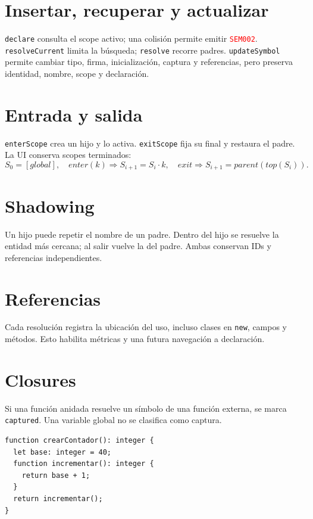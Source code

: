 \documentclass[11pt,letterpaper,oneside]{report}
\newcommand{\codigo}[1]{\texttt{#1}}
\newcommand{\diag}[1]{\textcolor{red}{\texttt{#1}}}
\begin{document}
\section{Insertar, recuperar y actualizar}

\codigo{declare} consulta el scope activo; una colisión permite emitir
\diag{SEM002}. \codigo{resolveCurrent} limita la búsqueda; \codigo{resolve} recorre
padres. \codigo{updateSymbol} permite cambiar tipo, firma, inicialización, captura y
referencias, pero preserva identidad, nombre, scope y declaración.

\section{Entrada y salida}

\codigo{enterScope} crea un hijo y lo activa. \codigo{exitScope} fija su final y
restaura el padre. La UI conserva scopes terminados:
\[
S_0=[global],\quad enter(k)\Rightarrow S_{i+1}=S_i\cdot k,\quad
exit\Rightarrow S_{i+1}=parent(top(S_i)).
\]

\section{Shadowing}

Un hijo puede repetir el nombre de un padre. Dentro del hijo se resuelve la entidad
más cercana; al salir vuelve la del padre. Ambas conservan IDs y referencias
independientes.

\section{Referencias}

Cada resolución registra la ubicación del uso, incluso clases en \codigo{new}, campos
y métodos. Esto habilita métricas y una futura navegación a declaración.

\section{Closures}

Si una función anidada resuelve un símbolo de una función externa, se marca
\codigo{captured}. Una variable global no se clasifica como captura.

\begin{verbatim}
function crearContador(): integer {
  let base: integer = 40;
  function incrementar(): integer {
    return base + 1;
  }
  return incrementar();
}
\end{verbatim}
\end{document}
